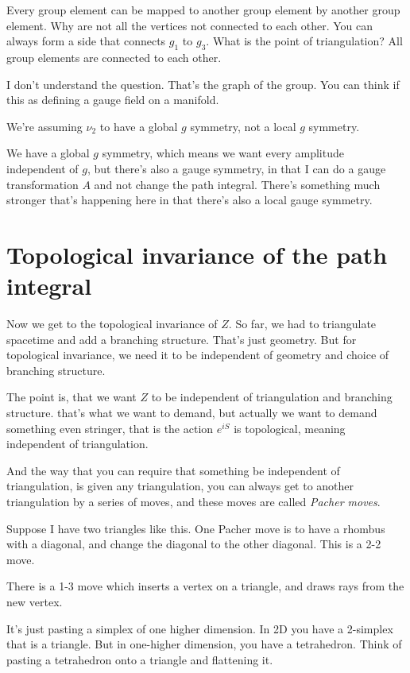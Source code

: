 \begin{question}
    Every group element can be mapped to another group element by another group
    element.
    Why are not all the vertices not connected to each other.
    You can always form a side that connects $g_1$ to $g_3$.
    What is the point of triangulation?
    All group elements are connected to each other.
\end{question}
I don't understand the question.
That's the graph of the group.
You can think if this as defining a gauge field on a manifold.

\begin{question}
    We're assuming $\nu_2$ to have a global $g$ symmetry,
    not a local $g$ symmetry.
\end{question}
We have a global $g$ symmetry,
which means we want every amplitude independent of $g$,
but there's also a gauge symmetry,
in that I can do a gauge transformation $A$ and not change the path integral.
There's something much stronger that's happening here in that there's also a
local gauge symmetry.


\section{Topological invariance of the path integral}
Now we get to the topological invariance of $Z$.
So far, 
we had to triangulate spacetime and add a branching structure.
That's just geometry.
But for topological invariance,
we need it to be independent of geometry and choice of branching structure.

The point is,
that we want $Z$ to be independent of triangulation and branching structure.
that's what we want to demand,
but actually we want to demand something even stringer,
that is the action $e^{iS}$ is topological,
meaning independent of triangulation.

And the way that you can require that something be independent of triangulation,
is given any triangulation,
you can always get to another triangulation by a series of moves,
and these moves are called \emph{Pacher moves}.

Suppose I have two triangles like this.
One Pacher move is to have a rhombus with a diagonal,
and change the diagonal to the other diagonal. This is a 2-2 move.

There is a 1-3 move which inserts a vertex on a triangle,
and draws rays from the new vertex.

It's just pasting a simplex of one higher dimension.
In 2D you have a 2-simplex that is a triangle.
But in one-higher dimension,
you have a tetrahedron.
Think of pasting a tetrahedron onto a triangle and flattening it.

